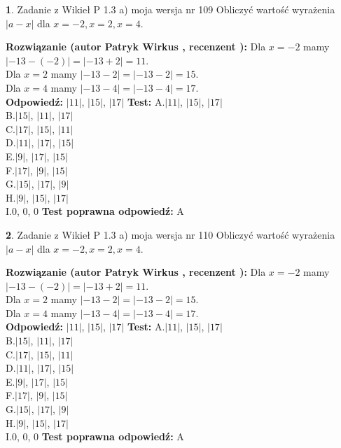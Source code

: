 \documentclass[12pt, a4paper]{article}
\theoremstyle{definition} %
\newtheorem{zad}{}
\newcommand{\zadStart}[1]{\begin{zad}#1\newline}
\newcommand{\zadStop}{\end{zad}}
\newcommand{\rozwStart}[2]{\noindent \textbf{Rozwiązanie (autor #1 , recenzent #2): }\newline}
\newcommand{\rozwStop}{\newline}
\newcommand{\odpStart}{\noindent \textbf{Odpowiedź:}\newline}
\newcommand{\odpStop}{\newline}
\newcommand{\testStart}{\noindent \textbf{Test:}\newline}
\newcommand{\testStop}{\newline}
\newcommand{\kluczStart}{\noindent \textbf{Test poprawna odpowiedź:}\newline}
\newcommand{\kluczStop}{\newline}
\begin{document}
\zadStart{Zadanie z Wikieł P 1.3 a) moja wersja nr 109}
Obliczyć wartość wyrażenia $|a - x|$ dla $x=-2,x=2,x=4$.
\zadStop
\rozwStart{Patryk Wirkus}{}
Dla $x = -2$ mamy $|-13 - (-2)| = |-13 + 2| = 11$.\\
Dla $x = 2$ mamy $|-13 - 2| = |-13 - 2| = 15$.\\
Dla $x = 4$ mamy $|-13 - 4| = |-13 - 4| = 17$.\\
\rozwStop
\odpStart
$|11|$, $|15|$, $|17|$
\odpStop
\testStart
A.$|11|$, $|15|$, $|17|$\\
B.$|15|$, $|11|$, $|17|$\\
C.$|17|$, $|15|$, $|11|$\\
D.$|11|$, $|17|$, $|15|$\\
E.$|9|$, $|17|$, $|15|$\\
F.$|17|$, $|9|$, $|15|$\\
G.$|15|$, $|17|$, $|9|$\\
H.$|9|$, $|15|$, $|17|$\\
I.$0$, $0$, $0$
\testStop
\kluczStart
A
\kluczStop



\zadStart{Zadanie z Wikieł P 1.3 a) moja wersja nr 110}
Obliczyć wartość wyrażenia $|a - x|$ dla $x=-2,x=2,x=4$.
\zadStop
\rozwStart{Patryk Wirkus}{}
Dla $x = -2$ mamy $|-13 - (-2)| = |-13 + 2| = 11$.\\
Dla $x = 2$ mamy $|-13 - 2| = |-13 - 2| = 15$.\\
Dla $x = 4$ mamy $|-13 - 4| = |-13 - 4| = 17$.\\
\rozwStop
\odpStart
$|11|$, $|15|$, $|17|$
\odpStop
\testStart
A.$|11|$, $|15|$, $|17|$\\
B.$|15|$, $|11|$, $|17|$\\
C.$|17|$, $|15|$, $|11|$\\
D.$|11|$, $|17|$, $|15|$\\
E.$|9|$, $|17|$, $|15|$\\
F.$|17|$, $|9|$, $|15|$\\
G.$|15|$, $|17|$, $|9|$\\
H.$|9|$, $|15|$, $|17|$\\
I.$0$, $0$, $0$
\testStop
\kluczStart
A
\kluczStop
\end{document}
